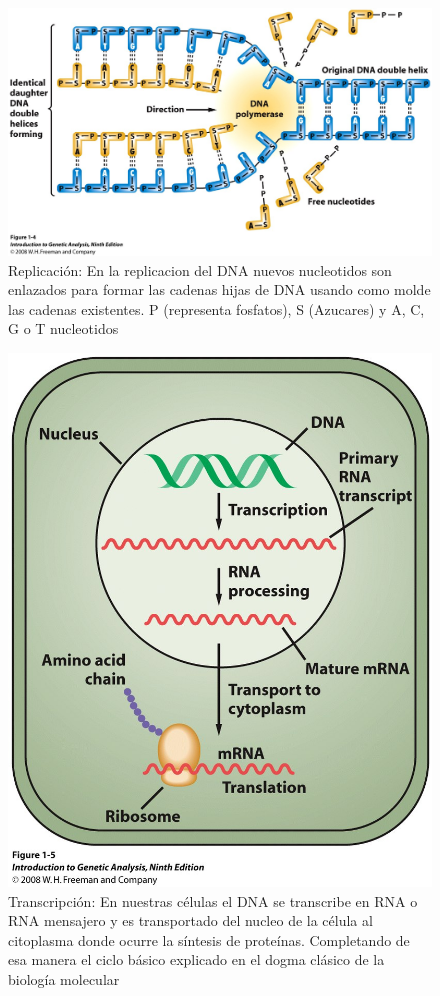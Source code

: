 \documentclass[10pt]{article}
\begin{document}
\begin{figure}[htb!]
\includegraphics[scale=0.3]{./figures/figure04.jpg}
\caption{Replicación: En la replicacion del DNA nuevos nucleotidos son enlazados para formar
las cadenas hijas de DNA usando como molde las cadenas existentes. P (representa
fosfatos), S (Azucares) y A, C, G o T nucleotidos}

\end{figure}

\begin{figure}[htb!]
\includegraphics[scale=0.3]{./figures/figure05.jpg}
\caption{Transcripción:
En nuestras células el DNA se transcribe en RNA o RNA mensajero
y es transportado del nucleo de la célula al citoplasma donde ocurre la síntesis
de proteínas. Completando de esa manera el ciclo básico explicado en el dogma clásico de la biología molecular}
\end{figure}
\end{document}
